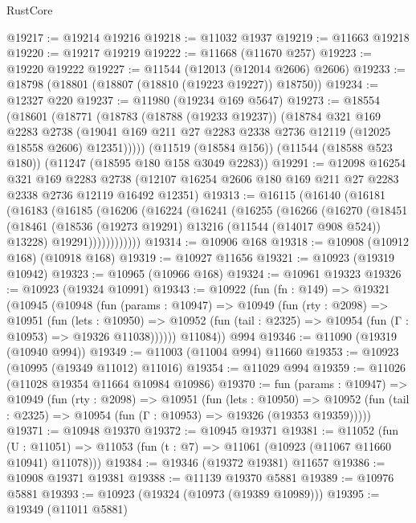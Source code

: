 \begin{lexlean}{RustCore}
\begin{coremodule}
@19217 := @19214 @19216
@19218 := @11032 @1937
@19219 := @11663 @19218
@19220 := @19217 @19219
@19222 := @11668 (@11670 @257)
@19223 := @19220 @19222
@19227 := @11544 (@12013 (@12014 @2606) @2606)
@19233 := @18798 (@18801 (@18807 (@18810 (@19223 @19227)) @18750))
@19234 := @12327 @220
@19237 := @11980 (@19234 @169 @5647)
@19273 := @18554
    (@18601
      (@18771
        (@18783
          (@18788 (@19233 @19237))
          (@18784
            @321
            @169
            @2283
            @2738
            (@19041 @169 @211 @27 @2283 @2338 @2736 @12119 (@12025 @18558 @2606) @12351)))))
    (@11519 (@18584 @156))
    (@11544 (@18588 @523 @180))
    (@11247 (@18595 @180 @158 @3049 @2283))
@19291 := @12098
    @16254
    @321
    @169
    @2283
    @2738
    (@12107 @16254 @2606 @180 @169 @211 @27 @2283 @2338 @2736 @12119 @16492 @12351)
@19313 := @16115
    (@16140
      (@16181
        (@16183
          (@16185
            (@16206
              (@16224
                (@16241
                  (@16255
                    (@16266
                      (@16270
                        (@18451
                          (@18461
                            (@18536 (@19273 @19291) @13216 (@11544 (@14017 @908 @524)) @13228)
                            @19291))))))))))))
@19314 := @10906 @168
@19318 := @10908 (@10912 @168) (@10918 @168)
@19319 := @10927 @11656
@19321 := @10923 (@19319 @10942)
@19323 := @10965 (@10966 @168)
@19324 := @10961 @19323
@19326 := @10923 (@19324 @10991)
@19343 := @10922
    (fun (fn : @149) =>
    @19321
      (@10945
        (@10948
          (fun (params : @10947) =>
          @10949
            (fun (rty : @2098) =>
            @10951
              (fun (lets : @10950) =>
              @10952 (fun (tail : @2325) => @10954 (fun (Γ : @10953) => @19326 @11038))))))
        @11084))
    @994
@19346 := @11090 (@19319 (@10940 @994))
@19349 := @11003 (@11004 @994) @11660
@19353 := @10923 (@10995 (@19349 @11012) @11016)
@19354 := @11029 @994
@19359 := @11026 (@11028 @19354 @11664 @10984 @10986)
@19370 := fun (params : @10947) =>
  @10949
    (fun (rty : @2098) =>
    @10951
      (fun (lets : @10950) =>
      @10952 (fun (tail : @2325) => @10954 (fun (Γ : @10953) => @19326 (@19353 @19359)))))
@19371 := @10948 @19370
@19372 := @10945 @19371
@19381 := @11052
    (fun (U : @11051) => @11053 (fun (t : @7) => @11061 (@10923 (@11067 @11660 @10941) @11078)))
@19384 := @19346 (@19372 @19381) @11657
@19386 := @10908 @19371 @19381
@19388 := @11139 @19370 @5881
@19389 := @10976 @5881
@19393 := @10923 (@19324 (@10973 (@19389 @10989)))
@19395 := @19349 (@11011 @5881)

\end{coremodule}
\end{lexlean}
